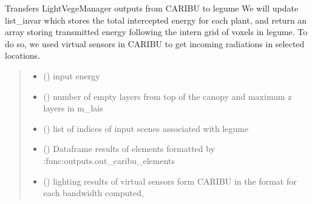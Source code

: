 \documentclass[letterpaper,10pt,english]{sphinxmanual}
\begin{document}
\begin{fulllineitems}
\label{\detokenize{reference:transfer.transfer_caribu_legume}}
\pysigstartsignatures
{}
\pysigstopsignatures
\sphinxAtStartPar
Transfers LightVegeManager outputs from CARIBU to l\sphinxhyphen{}egume
We will update list\_invar which stores the total intercepted energy for each plant, and return
an array storing transmitted energy following the intern grid of voxels in l\sphinxhyphen{}egume. To do so, we
used virtual sensors in CARIBU to get incoming radiations in selected locations.
\begin{quote}\begin{description}
\begin{itemize}
\item {} 
\sphinxAtStartPar
{} () \textendash{} input energy

\item {} 
\sphinxAtStartPar
{} () \textendash{} number of empty layers from top of the canopy and maximum z layers in m\_lais

\item {} 
\sphinxAtStartPar
{} () \textendash{} list of indices of input scenes associated with l\sphinxhyphen{}egume

\item {} 
\sphinxAtStartPar
{} () \textendash{} Dataframe results of elements formatted by :func:outputs.out\_caribu\_elements

\item {} 
\sphinxAtStartPar
{} () \textendash{} 
\sphinxAtStartPar
lighting results of virtual sensors form CARIBU in the format for each bandwidth computed,


\end{itemize}
\end{description}
\end{quote}
\end{fulllineitems}
\end{document}
